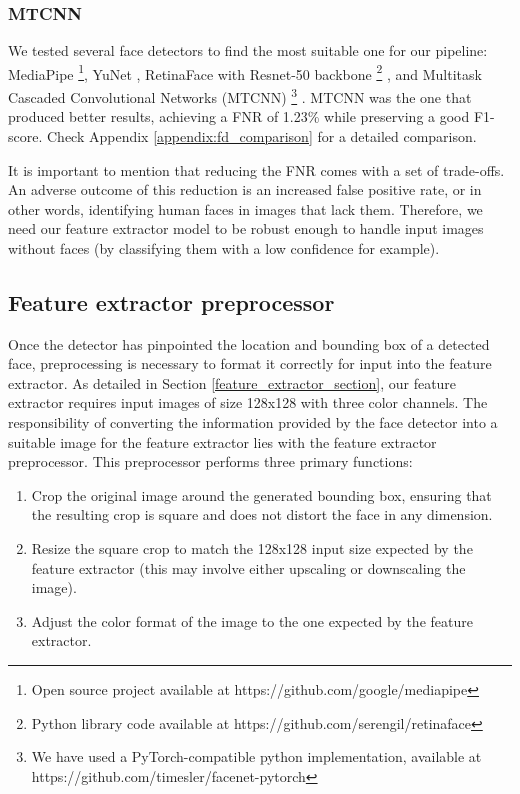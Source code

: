 \documentclass[11pt, a4paper]{article}
\numberwithin{equation}{subsection}
\begin{document}
\subsubsection{MTCNN}

We tested several face detectors to find the most suitable one for our pipeline: MediaPipe \footnote{Open source project available at https://github.com/google/mediapipe}, YuNet \cite{wu2023yunet}, RetinaFace with Resnet-50 backbone \footnote{Python library code available at https://github.com/serengil/retinaface} \cite{deng2020retinaface}, and Multitask Cascaded Convolutional Networks (MTCNN) \footnote{We have used a PyTorch-compatible python implementation, available at https://github.com/timesler/facenet-pytorch} \cite{zhang2016joint}. MTCNN was the one that produced better results, achieving a FNR of 1.23\% while preserving a good F1-score. Check Appendix \ref{appendix:fd_comparison} for a detailed comparison.

It is important to mention that reducing the FNR comes with a set of trade-offs. An adverse outcome of this reduction is an increased false positive rate, or in other words, identifying human faces in images that lack them. Therefore, we need our feature extractor model to be robust enough to handle input images without faces (by classifying them with a low confidence for example).


\subsection{Feature extractor preprocessor}

Once the detector has pinpointed the location and bounding box of a detected face, preprocessing is necessary to format it correctly for input into the feature extractor. As detailed in Section \ref{feature_extractor_section}, our feature extractor requires input images of size 128x128 with three color channels. The responsibility of converting the information provided by the face detector into a suitable image for the feature extractor lies with the feature extractor preprocessor. This preprocessor performs three primary functions:

\begin{enumerate}
    \item Crop the original image around the generated bounding box, ensuring that the resulting crop is square and does not distort the face in any dimension.
    \item Resize the square crop to match the 128x128 input size expected by the feature extractor (this may involve either upscaling or downscaling the image).
    \item Adjust the color format of the image to the one expected by the feature extractor.
\end{enumerate}
\end{document}
